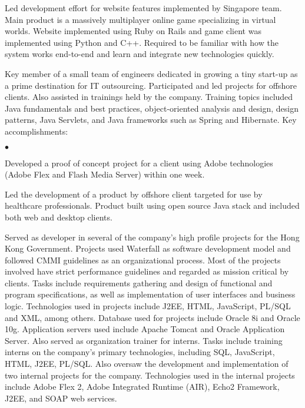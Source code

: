 \documentclass[10.5pt]{article}
\begin{document}
\begin{longtext}
Led development effort for website features implemented by Singapore team. Main product is a massively multiplayer online
game specializing in virtual worlds. Website implemented using Ruby on Rails and game client was implemented using Python
and C++. Required to be familiar with how the system works end-to-end and learn and integrate new technologies quickly.
\tinyskip
\end{longtext}
\begin{longtext}
Key member of a small team of engineers dedicated in growing a tiny start-up as a prime destination for IT outsourcing.
Participated and led projects for offshore clients. Also assisted in trainings held by the company.
Training topics included Java fundamentals and best practices, object-oriented analysis and design, design patterns, Java Servlets, and Java frameworks such as Spring and Hibernate.
Key accomplishments:
\begin{list}{$\bullet$}{
}
\item Developed a proof of concept project for a client using Adobe technologies (Adobe Flex
and Flash Media Server) within one week.
\item Led the development of a product by offshore client targeted for use
by healthcare professionals. Product built using open source Java stack and included both web and desktop clients.

\end{list}
\end{longtext}
\begin{longtext}
Served as developer in several of the company's high profile projects for the Hong Kong
Government. Projects used Waterfall as software development model and followed CMMI
guidelines as an organizational process. Most of the projects involved have strict performance
guidelines and regarded as mission critical by clients. Tasks include requirements gathering and
design of functional and program specifications, as well as implementation of user interfaces and
business logic. Technologies used in projects include J2EE, HTML, JavaScript, PL/SQL and
XML, among others. Database used for projects include Oracle 8i and Oracle 10g. Application
servers used include Apache Tomcat and Oracle Application Server.
\shortskip
Also served as organization trainer for interns. Tasks include training interns on the company's
primary technologies, including SQL, JavaScript, HTML, J2EE, PL/SQL. Also oversaw the development and implementation of two internal projects for the company. Technologies used in the internal projects include Adobe Flex 2, Adobe Integrated Runtime (AIR), Echo2 Framework,
J2EE, and SOAP web services.\\
\end{longtext}
\end{document}
